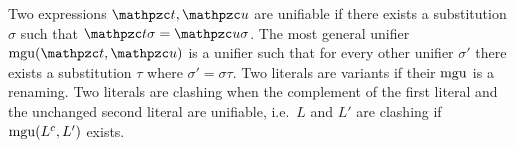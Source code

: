 
\begin{definition}\label{def:unifier}
Two expressions $\mct, \mcu$ are {\myem unifiable} if there exists a substitution $\sigma$ such that $\mct\sigma=\mcu\sigma$.
The {\myem most general unifier} $\mgu(\mct,\mcu)$ is a unifier such that
for every other unifier $\sigma'$ there exists a substitution $\tau$ where
$\sigma' = \sigma \tau$. 
Two literals are variants if their $\operatorname{mgu}$ is a renaming.
Two literals are {\myem clashing} when the complement of the first literal 
and the unchanged second literal are unifiable, i.e.~$L$ and $L'$ are clashing if $\operatorname{mgu}(L^c, L')$ exists.
\end{definition}